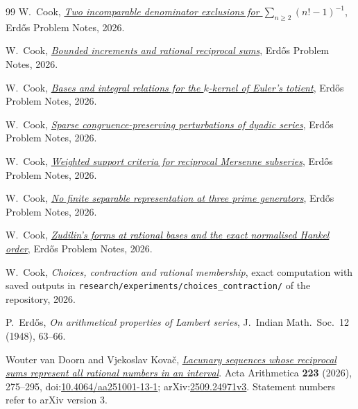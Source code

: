 \documentclass[11pt]{article}
\begin{document}
\begin{thebibliography}{99}
 W.~Cook,
  \href{\repobase/paper/68/erdos-68-factorial-denominator-irrationality.pdf}{\emph{Two
  incomparable denominator exclusions for $\sum_{n\ge2}(n!-1)^{-1}$}},
  Erd\H{o}s Problem Notes, 2026.

 W.~Cook,
  \href{\repobase/paper/243/erdos-243-reciprocal-tail-rigidity.pdf}{\emph{Bounded
  increments and rational reciprocal sums}}, Erd\H{o}s Problem Notes, 2026.

 W.~Cook,
  \href{\repobase/paper/249/erdos-249-binary-totient-series.pdf}{\emph{Bases and
  integral relations for the $k$-kernel of Euler's totient}}, Erd\H{o}s Problem
  Notes, 2026.

 W.~Cook,
  \href{\repobase/paper/251/erdos-251-prime-gap-dyadic-series.pdf}{\emph{Sparse
  congruence-preserving perturbations of dyadic series}}, Erd\H{o}s Problem
  Notes, 2026.

 W.~Cook,
  \href{\repobase/paper/257/erdos-257-mersenne-support-subseries.pdf}{\emph{Weighted
  support criteria for reciprocal Mersenne subseries}}, Erd\H{o}s Problem Notes,
  2026.

 W.~Cook,
  \href{\repobase/paper/269/erdos-269-three-prime-running-lcm.pdf}{\emph{No
  finite separable representation at three prime generators}}, Erd\H{o}s Problem
  Notes, 2026.

 W.~Cook,
  \href{\repobase/paper/1049/erdos-1049-rational-base-lambert.pdf}{\emph{Zudilin's
  forms at rational bases and the exact normalised Hankel order}}, Erd\H{o}s
  Problem Notes, 2026.

 W.~Cook,
  \emph{Choices, contraction and rational membership}, exact computation with saved outputs in \texttt{research/experiments/choices\_contraction/} of the repository,
  2026.

 P.~Erd\H{o}s, \emph{On arithmetical properties of Lambert
  series}, J.~Indian Math.\ Soc.\ 12 (1948), 63--66.

 Wouter van Doorn and Vjekoslav Kova\v{c}, \href{https://arxiv.org/abs/2509.24971v3}{\emph{Lacunary sequences whose reciprocal sums represent all rational numbers in an interval}}.
  Acta Arithmetica \textbf{223} (2026), 275--295, doi:\href{https://doi.org/10.4064/aa251001-13-1}{10.4064/aa251001-13-1}; arXiv:\href{https://arxiv.org/abs/2509.24971v3}{2509.24971v3}. Statement numbers refer to arXiv version 3.


\end{thebibliography}
\end{document}
